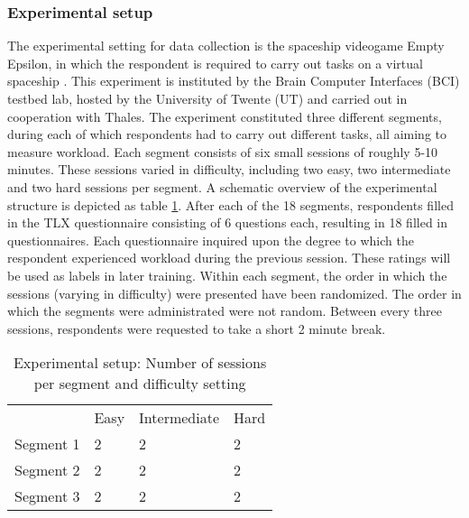 \documentclass{article}
\begin{document}
\subsubsection{Experimental setup}
The experimental setting for data collection is the spaceship videogame Empty Epsilon, in which the respondent is required to carry out tasks on a virtual spaceship \cite{daid2016empty}. This experiment is instituted by the Brain Computer Interfaces (BCI) testbed lab, hosted by the University of Twente (UT) and carried out in cooperation with Thales. The experiment constituted three different segments, during each of which respondents had to carry out different tasks, all aiming to measure workload. Each segment consists of six small sessions of roughly 5-10 minutes. These sessions varied in difficulty, including two easy, two intermediate and two hard sessions per segment. A schematic overview of the experimental structure is depicted as table \ref{table:expsetup}. After each of the 18 segments, respondents filled in the TLX questionnaire consisting of 6 questions each, resulting in 18 filled in questionnaires. Each questionnaire inquired upon the degree to which the respondent experienced workload during the previous session. These ratings will be used as labels in later training. Within each segment, the order in which the sessions (varying in difficulty) were presented have been randomized. The order in which the segments were administrated were not random. Between every three sessions, respondents were requested to take a short 2 minute break.
\bgroup
\def\arraystretch{1.6}%
\begin{table}[h]
\centering
\caption{Experimental setup: Number of sessions per segment and difficulty setting}
\label{table:expsetup}
\begin{tabular}{llll}
                               & Easy                   & Intermediate           & Hard                   \\ \cline{2-4} 
\multicolumn{1}{l|}{Segment 1} & \multicolumn{1}{l|}{2} & \multicolumn{1}{l|}{2} & \multicolumn{1}{l|}{2} \\ \cline{2-4} 
\multicolumn{1}{l|}{Segment 2} & \multicolumn{1}{l|}{2} & \multicolumn{1}{l|}{2} & \multicolumn{1}{l|}{2} \\ \cline{2-4} 
\multicolumn{1}{l|}{Segment 3} & \multicolumn{1}{l|}{2} & \multicolumn{1}{l|}{2} & \multicolumn{1}{l|}{2} \\ \cline{2-4} 
\end{tabular}
\end{table}
\egroup
\end{document}
